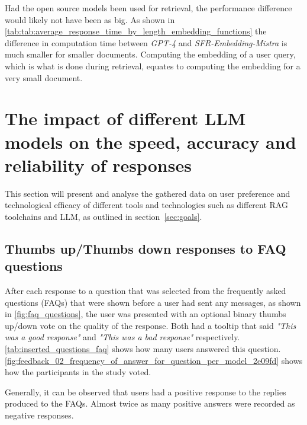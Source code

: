 Had the open source models been used for retrieval, the performance difference would likely not have been as big. As shown in \autoref{tab:tab:average_response_time_by_length_embedding_functions} the difference in computation time between \textit{GPT-4} and \textit{SFR-Embedding-Mistra} is much smaller for smaller documents. Computing the embedding of a user query, which is what is done during retrieval, equates to computing the embedding for a very small document.







\section{The impact of different LLM models on the speed, accuracy and reliability of responses}
\label{sec:impact_of_llm_on_user_preferences}


This section will present and analyse the gathered data on user preference and technological efficacy of different tools and technologies such as different \gls{RAG} toolchains and \gls{LLM}, as outlined in section~\ref{sec:goals}.


\subsection{Thumbs up/Thumbs down responses to FAQ questions}


After each response to a question that was selected from the frequently asked questions (FAQs) that were shown before a user had sent any messages, as shown in \autoref{fig:faq_questions}, the user was presented with an optional binary thumbs up/down vote on the quality of the response. Both had a tooltip that said \textit{"This was a good response"} and \textit{"This was a bad response"} respectively. \autoref{tab:inserted_questions_faq} shows how many users answered this question. \autoref{fig:feedback_02_frequency_of_answer_for_question_per_model_2e09fd} shows how the participants in the study voted.








Generally, it can be observed that users had a positive response to the replies produced to the FAQs. Almost twice as many positive answers were recorded as negative responses.


